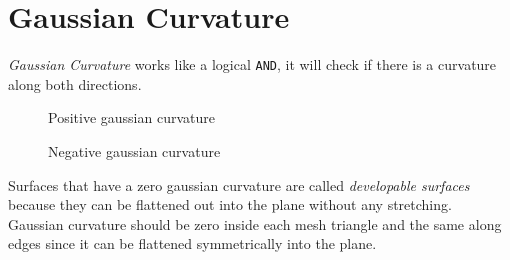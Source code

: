 \section{Gaussian Curvature}
\textit{Gaussian Curvature} works like a logical \texttt{AND}, it will check if there is a curvature along both directions.

\begin{figure}[h]
  \centering
  \caption{Positive gaussian curvature}\label{fig:positive-gaussian}
  \endminipage
  \centering
  \caption{Negative gaussian curvature}\label{fig:negative-gaussian}
  \endminipage
\end{figure}
Surfaces that have a zero gaussian curvature are called \textit{developable surfaces} because they can be flattened out into the plane without any stretching. Gaussian curvature should be zero inside each mesh triangle and the same along edges since it can be flattened symmetrically into the plane.
